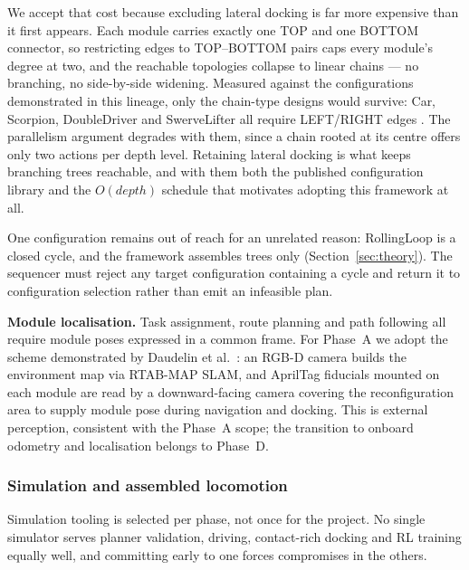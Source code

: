 \documentclass[11pt,a4paper]{article}
\newcounter{gsub}
\newcommand{\gsubsub}[1]{\subsubsection*{#1}}
\begin{document}
\medskip
\noindent We accept that cost because excluding lateral docking is far more
expensive than it first appears. Each module carries exactly one TOP and one
BOTTOM connector, so restricting edges to TOP--BOTTOM pairs caps every module's
degree at two, and the reachable topologies collapse to linear chains --- no
branching, no side-by-side widening. Measured against the configurations
demonstrated in this lineage, only the chain-type designs would survive: Car,
Scorpion, DoubleDriver and SwerveLifter all require LEFT/RIGHT edges
\cite{daudelin2018,jing2018}. The parallelism argument degrades with them,
since a chain rooted at its centre offers only two actions per depth level.
Retaining lateral docking is what keeps branching trees reachable, and with
them both the published configuration library and the $O(depth)$ schedule that
motivates adopting this framework at all.

\medskip
\noindent One configuration remains out of reach for an unrelated reason:
RollingLoop is a closed cycle, and the framework assembles trees only
(Section~\ref{sec:theory}). The sequencer must reject any target configuration
containing a cycle and return it to configuration selection rather than emit an
infeasible plan.

\medskip
\noindent\textbf{Module localisation.} Task assignment, route planning and path
following all require module poses expressed in a common frame. For Phase~A we
adopt the scheme demonstrated by Daudelin et al.\ \cite{daudelin2018}: an RGB-D
camera builds the environment map via RTAB-MAP SLAM, and AprilTag fiducials
mounted on each module are read by a downward-facing camera covering the
reconfiguration area to supply module pose during navigation and docking. This
is external perception, consistent with the Phase~A scope; the transition to
onboard odometry and localisation belongs to Phase~D.

\gsubsub{Simulation and assembled locomotion}

Simulation tooling is selected per phase, not once for the project. No single
simulator serves planner validation, driving, contact-rich docking and RL
training equally well, and committing early to one forces compromises in the
others.
\end{document}
